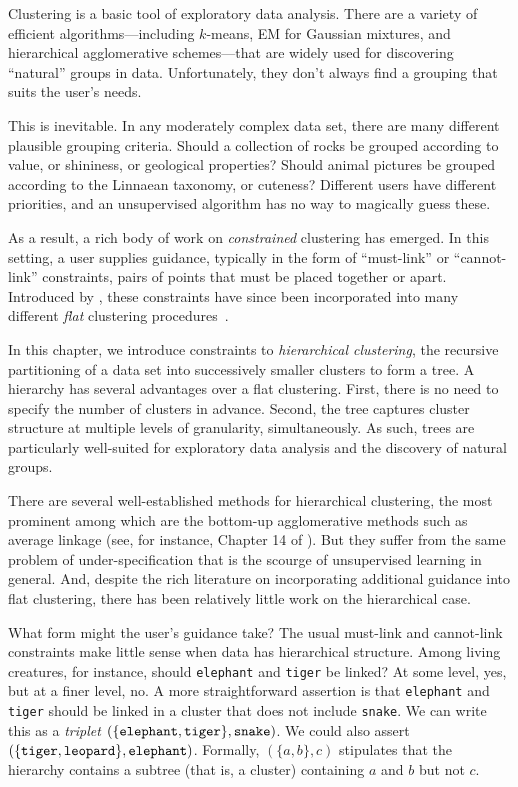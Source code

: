 Clustering is a basic tool of exploratory data analysis. There are a variety of efficient algorithms---including $k$-means, EM for Gaussian mixtures, and hierarchical agglomerative schemes---that are widely used for discovering ``natural'' groups in data. Unfortunately, they don't always find a grouping that suits the user's needs.

This is inevitable. In any moderately complex data set, there are many different plausible grouping criteria. Should a collection of rocks be grouped according to value, or shininess, or geological properties? Should animal pictures be grouped according to the Linnaean taxonomy, or cuteness? Different users have different priorities, and an unsupervised algorithm has no way to magically guess these.

As a result, a rich body of work on {\it constrained} clustering has emerged.
In this setting, a user supplies guidance, typically in the form of ``must-link'' or ``cannot-link'' constraints, pairs of points that must be placed together or apart. Introduced by \citet{Wagstaff2001}, these constraints have since been incorporated into many different {\it flat} clustering procedures~\citep{Wagstaff2000,Bansal2004,Basu2004,Kulis2009,Biswas2014}.

In this chapter, we introduce constraints to {\it hierarchical clustering}, the recursive partitioning of a data set into successively smaller clusters to form a tree. A hierarchy has several advantages over a flat clustering. First, there is no need to specify the number of clusters in advance. Second, the tree captures cluster structure at multiple levels of granularity, simultaneously. As such, trees are particularly well-suited for exploratory data analysis and the discovery of natural groups.

There are several well-established methods for hierarchical clustering, the most prominent among which are the bottom-up agglomerative methods such as average linkage (see, for instance, Chapter 14 of \citet{Hastie2009}). But they suffer from the same problem of under-specification that is the scourge of unsupervised learning in general. And, despite the rich literature on incorporating additional guidance into flat clustering, there has been relatively little work on the hierarchical case.

What form might the user's guidance take? The usual must-link and cannot-link constraints make little sense when data has hierarchical structure. Among living creatures, for instance, should {\tt elephant} and {\tt tiger} be linked? At some level, yes, but at a finer level, no. A more straightforward assertion is that {\tt elephant} and {\tt tiger} should be linked in a cluster that does not include {\tt snake}. We can write this as a {\it triplet} $(\{\mbox{\tt elephant}, \mbox{\tt tiger}\}, \mbox{\tt snake})$. We could also assert $(\{\mbox{\tt tiger}, \mbox{\tt leopard}\}, \mbox{\tt elephant})$. Formally, $(\{a,b\},c)$ stipulates that the hierarchy contains a subtree (that is, a cluster) containing $a$ and $b$ but not $c$.


